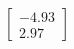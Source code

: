 \documentclass[preview]{standalone}
\begin{document}
\begin{align*}
\begin{bmatrix} -4.93 \\ 2.97 \end{bmatrix}
\end{align*}
\end{document}
